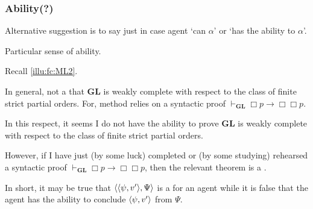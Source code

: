 \subsubsection{Ability(?)}
\label{cha:sec:fcs-def:ability}

\begin{note}
  Alternative suggestion is to say \pevent{} just in case agent `can \(\alpha\)' or `has the ability to \(\alpha\)'.

  Particular sense of ability.

  Recall \autoref{illu:fc:ML2}.

  In general, not a \fc{} that \(\mathbf{GL}\) is weakly complete with respect to the class of finite strict partial orders.
  For, method relies on a syntactic proof \(\vdash_{\mathbf{GL}} \Box p \rightarrow \Box \Box p\).

  In this respect, it seems I do not have the ability to prove \(\mathbf{GL}\) is weakly complete with respect to the class of finite strict partial orders.

  However, if I have just (by some luck) completed or (by some studying) rehearsed a syntactic proof \(\vdash_{\mathbf{GL}} \Box p \rightarrow \Box \Box p\), then the relevant theorem is a \fc{}.

  In short, it may be true that \(\langle \langle \psi, v' \rangle, \Psi \rangle\) is a \fc{} for an agent while it is false that the agent has the ability to conclude \(\langle \psi, v' \rangle\) from \(\Psi\).
\end{note}

